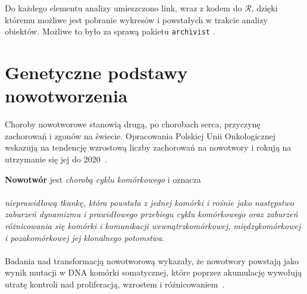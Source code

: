 Do każdego elementu analizy umieszczono link, wraz z kodem do $\mathcal{R}$, dzięki któremu możliwe jest pobranie wykresów i powstałych w trakcie analizy obiektów. Możliwe to było za sprawą pakietu \texttt{archivist} \citep{archivist}.
\newpage
\section{Genetyczne podstawy nowotworzenia}\label{cha:gen}
Choroby nowotworowe stanowią drugą, po chorobach serca, przyczynę zachorowań i zgonów na świecie. Opracowania Polskiej Unii Onkologicznej wskazują na tendencję wzrostową liczby zachorowań na nowotwory i rokują na utrzymanie się jej do 2020~\citep{zikula}.

\textbf{Nowotwór} jest \textit{chorobą cyklu komórkowego} i oznacza \citep{zikula2} \\ \ \\ \textit{nieprawidłową tkankę, która powstała z jednej komórki i rośnie jako następstwo zaburzeń dynamizmu i prawidłowego przebiegu cyklu komórkowego oraz zaburzeń różnicowania się komórki i komunikacji wewnątrzkomórkowej, międzykomórkowej i pozakomórkowej jej klonalnego potomstwa}. \\ \ \\
Badania nad transformacją nowotworową wykazały, że nowotwory powstają jako wynik mutacji w DNA komórki somatycznej, które poprzez akumulację wywołują utratę kontroli nad proliferacją, wzrostem i różnicowaniem~\citep{zikula5}.

